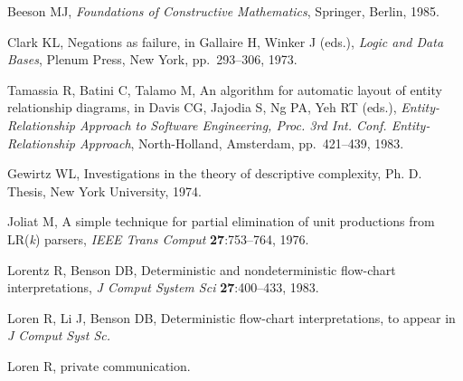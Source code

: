 \documentclass{ws-jmmb}
\begin{document}
\begin{thebibliography}{0}
 Beeson MJ, {\it Foundations of Constructive Mathematics}, 
Springer, Berlin, 1985.

 Clark KL, Negations as failure, in Gallaire H, 
Winker J (eds.), {\it Logic and Data Bases}, Plenum Press, New York, 
pp.~293--306, 1973.

 Tamassia R, Batini C, Talamo M, An 
algorithm for automatic layout of entity relationship diagrams, 
in Davis CG, Jajodia S, Ng PA, Yeh RT (eds.), 
{\it Entity-Relationship Approach to Software Engineering, 
Proc. 3rd Int. Conf. Entity-Relationship Approach}, 
North-Holland, Amsterdam, pp.~421--439, 1983.

 Gewirtz WL, Investigations in the theory of 
descriptive complexity, Ph. D. Thesis, New York University, 1974.

 Joliat M, A simple technique for partial elimination of 
unit productions from LR({\it k}) parsers, {\it IEEE Trans Comput} 
{\bf 27}:753--764, 1976.

 Lorentz R, Benson DB, Deterministic and 
nondeterministic flow-chart interpretations, {\it J Comput System Sci} 
{\bf 27}:400--433, 1983.

 Loren R, Li J, Benson DB, Deterministic flow-chart 
interpretations, to appear in {\it J Comput Syst Sc.}

 Loren R, private communication.

\end{thebibliography}
\end{document}
